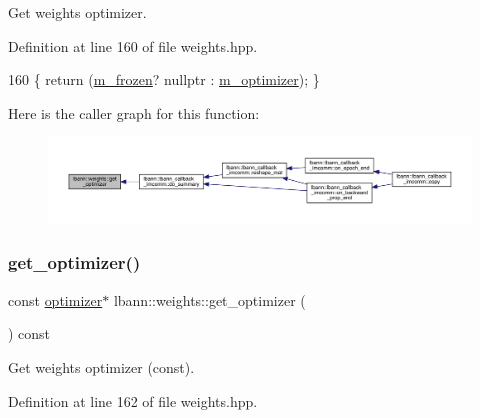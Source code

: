 Get weights optimizer. 

Definition at line 160 of file weights.\+hpp.


\begin{DoxyCode}
160 \{ \textcolor{keywordflow}{return} (\hyperlink{classlbann_1_1weights_a3962305112ba98ef2eb89c6f7035f6dd}{m\_frozen}? \textcolor{keyword}{nullptr} : \hyperlink{classlbann_1_1weights_a5f3b4d4a3ad390c2a9bdbe6c4971de65}{m\_optimizer}); \}
\end{DoxyCode}
Here is the caller graph for this function\+:\nopagebreak
\begin{figure}[H]
\begin{center}
\leavevmode
\includegraphics[width=350pt]{classlbann_1_1weights_accdbbd16ada5b5b12890431b92c2e706_icgraph}
\end{center}
\end{figure}
\mbox{\label{classlbann_1_1weights_a5754ec6534e1b47e2363c2848649f8a2}} 
\subsubsection{\texorpdfstring{get\+\_\+optimizer()}{get\_optimizer()}\hspace{0.1cm}{\footnotesize\ttfamily [2/2]}}
{\footnotesize\ttfamily const \hyperlink{classlbann_1_1optimizer}{optimizer}$\ast$ lbann\+::weights\+::get\+\_\+optimizer (\begin{DoxyParamCaption}{ }\end{DoxyParamCaption}) const\hspace{0.3cm}{\ttfamily [inline]}}

Get weights optimizer (const). 

Definition at line 162 of file weights.\+hpp.


